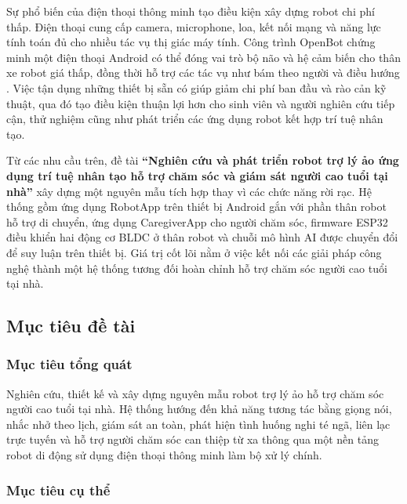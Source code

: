 Sự phổ biến của điện thoại thông minh tạo điều kiện xây dựng robot chi phí thấp. Điện thoại cung cấp camera, microphone, loa, kết nối mạng và năng lực tính toán đủ cho nhiều tác vụ thị giác máy tính. Công trình OpenBot chứng minh một điện thoại Android có thể đóng vai trò bộ não và hệ cảm biến cho thân xe robot giá thấp, đồng thời hỗ trợ các tác vụ như bám theo người và điều hướng . Việc tận dụng những thiết bị sẵn có giúp giảm chi phí ban đầu và rào cản kỹ thuật, qua đó tạo điều kiện thuận lợi hơn cho sinh viên và người nghiên cứu tiếp cận, thử nghiệm cũng như phát triển các ứng dụng robot kết hợp trí tuệ nhân tạo.

Từ các nhu cầu trên, đề tài \textbf{``Nghiên cứu và phát triển robot trợ lý ảo ứng dụng trí tuệ nhân tạo hỗ trợ chăm sóc và giám sát người cao tuổi tại nhà''} xây dựng một nguyên mẫu tích hợp thay vì các chức năng rời rạc. Hệ thống gồm ứng dụng RobotApp trên thiết bị Android gắn với phần thân robot hỗ trợ di chuyển, ứng dụng CaregiverApp cho người chăm sóc, firmware ESP32 điều khiển hai động cơ BLDC ở thân robot và chuỗi mô hình AI được chuyển đổi để suy luận trên thiết bị. Giá trị cốt lõi nằm ở việc kết nối các giải pháp công nghệ thành một hệ thống tương đối hoàn chỉnh hỗ trợ chăm sóc người cao tuổi tại nhà.

\subsection{Mục tiêu đề tài}

\subsubsection{Mục tiêu tổng quát}

Nghiên cứu, thiết kế và xây dựng nguyên mẫu robot trợ lý ảo hỗ trợ chăm sóc người cao tuổi tại nhà. Hệ thống hướng đến khả năng tương tác bằng giọng nói, nhắc nhở theo lịch, giám sát an toàn, phát hiện tình huống nghi té ngã, liên lạc trực tuyến và hỗ trợ người chăm sóc can thiệp từ xa thông qua một nền tảng robot di động sử dụng điện thoại thông minh làm bộ xử lý chính.

\subsubsection{Mục tiêu cụ thể}


